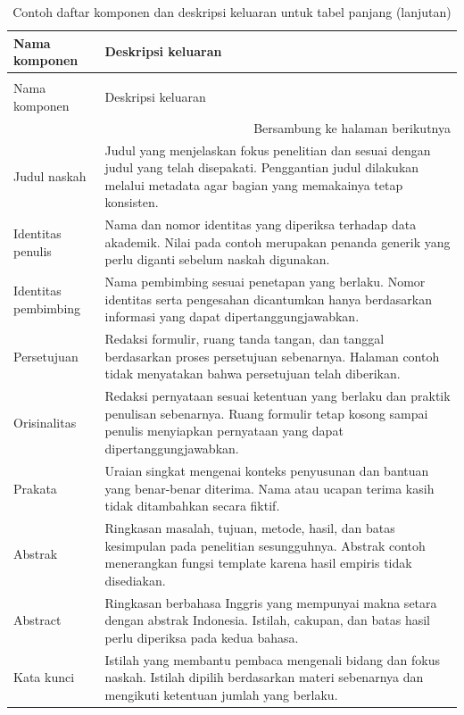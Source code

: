 \begingroup
\setlength{\tabcolsep}{5pt}
\begin{longtable}{p{3.5cm}p{9.0cm}}
  \caption{Contoh daftar komponen dan deskripsi keluaran untuk tabel panjang}
  \label{tab:contoh-pemeriksaan-panjang}\\
  \toprule
  Nama komponen & Deskripsi keluaran \\
  \midrule
  \endfirsthead
  \caption[]{Contoh daftar komponen dan deskripsi keluaran untuk tabel panjang (lanjutan)}\\
  \toprule
  Nama komponen & Deskripsi keluaran \\
  \midrule
  \endhead
  \midrule
  \multicolumn{2}{r}{Bersambung ke halaman berikutnya} \\
  \endfoot
  \bottomrule
  \endlastfoot
  Judul naskah & Judul yang menjelaskan fokus penelitian dan sesuai dengan judul yang telah disepakati. Penggantian judul dilakukan melalui metadata agar bagian yang memakainya tetap konsisten. \\
  Identitas penulis & Nama dan nomor identitas yang diperiksa terhadap data akademik. Nilai pada contoh merupakan penanda generik yang perlu diganti sebelum naskah digunakan. \\
  Identitas pembimbing & Nama pembimbing sesuai penetapan yang berlaku. Nomor identitas serta pengesahan dicantumkan hanya berdasarkan informasi yang dapat dipertanggungjawabkan. \\
  Persetujuan & Redaksi formulir, ruang tanda tangan, dan tanggal berdasarkan proses persetujuan sebenarnya. Halaman contoh tidak menyatakan bahwa persetujuan telah diberikan. \\
  Orisinalitas & Redaksi pernyataan sesuai ketentuan yang berlaku dan praktik penulisan sebenarnya. Ruang formulir tetap kosong sampai penulis menyiapkan pernyataan yang dapat dipertanggungjawabkan. \\
  Prakata & Uraian singkat mengenai konteks penyusunan dan bantuan yang benar-benar diterima. Nama atau ucapan terima kasih tidak ditambahkan secara fiktif. \\
  Abstrak & Ringkasan masalah, tujuan, metode, hasil, dan batas kesimpulan pada penelitian sesungguhnya. Abstrak contoh menerangkan fungsi template karena hasil empiris tidak disediakan. \\
  Abstract & Ringkasan berbahasa Inggris yang mempunyai makna setara dengan abstrak Indonesia. Istilah, cakupan, dan batas hasil perlu diperiksa pada kedua bahasa. \\
  Kata kunci & Istilah yang membantu pembaca mengenali bidang dan fokus naskah. Istilah dipilih berdasarkan materi sebenarnya dan mengikuti ketentuan jumlah yang berlaku. \\

\end{longtable}
